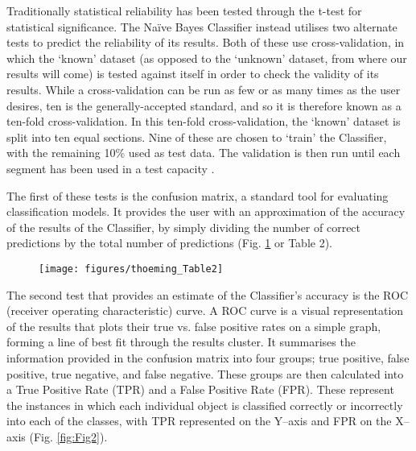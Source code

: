 	
	Traditionally statistical reliability has been tested through the t-test for statistical significance. The Naïve Bayes Classifier instead utilises two alternate tests to predict the reliability of its results. Both of these use cross-validation, in which the ‘known’ dataset (as opposed to the ‘unknown’ dataset, from where our results will come) is tested against itself in order to check the validity of its results. While a cross-validation can be run as few or as many times as the user desires, ten is the generally-accepted standard, and so it is therefore known as a ten-fold cross-validation. In this ten-fold cross-validation, the ‘known’ dataset is split into ten equal sections. Nine of these are chosen to ‘train’ the Classifier, with the remaining 10\% used as test data. The validation is then run until each segment has been used in a test capacity \parencite[187]{Tan_2006}. 
	
	The first of these tests is the confusion matrix, a standard tool for evaluating classification models. It provides the user with an approximation of the accuracy of the results of the Classifier, by simply dividing the number of correct predictions by the total number of predictions \parencite[149]{Tan_2006}(Fig. \ref{fig:Table2} or Table 2).
	
		\begin{figure}[!htb]
			\texttt{[image: figures/thoeming\_Table2]}
			\centering
			\label{fig:Table2}
		\end{figure}	
	The second test that provides an estimate of the Classifier’s accuracy is the ROC (receiver operating characteristic) curve. A ROC curve is a visual representation of the results that plots their true vs. false positive rates on a simple graph, forming a line of best fit through the results cluster. It summarises the information provided in the confusion matrix into four groups; true positive, false positive, true negative, and false negative. These groups are then calculated into a True Positive Rate (TPR) and a False Positive Rate (FPR). These represent the instances in which each individual object is classified correctly or incorrectly into each of the classes, with TPR represented on the Y–axis and FPR on the X–axis \parencite[298--301]{Tan_2006}(Fig. \ref{fig:Fig2}).
	
